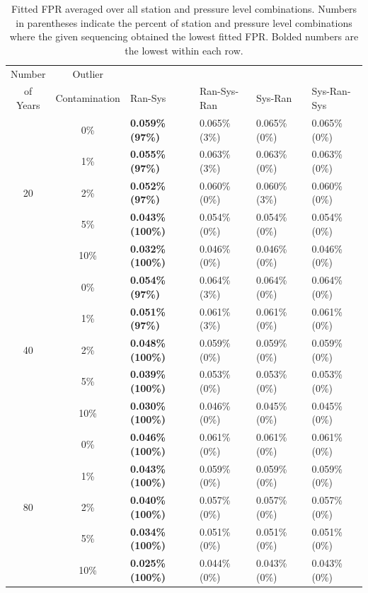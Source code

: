 \documentclass[12pt]{article}
\begin{document}
\begin{landscape}
\begin{table}[ht]
	\centering
	\begin{tabular}{cc|llll}
		\hline
		Number & Outlier & & & &\\ 
		of Years & Contamination & Ran-Sys & Ran-Sys-Ran & Sys-Ran & Sys-Ran-Sys\\ 
		\hline
		 & 0\% & \textbf{0.059\% (97\%)} & 0.065\% (3\%) & 0.065\% (0\%) & 0.065\% (0\%) \\ 
		 & 1\% & \textbf{0.055\% (97\%)} & 0.063\% (3\%) & 0.063\% (0\%) & 0.063\% (0\%) \\ 
		20 & 2\% & \textbf{0.052\% (97\%)} & 0.060\% (0\%) & 0.060\% (3\%) & 0.060\% (0\%) \\ 
		 & 5\% & \textbf{0.043\% (100\%)} & 0.054\% (0\%) & 0.054\% (0\%) & 0.054\% (0\%) \\ 
		 & 10\% & \textbf{0.032\% (100\%)} & 0.046\% (0\%) & 0.046\% (0\%) & 0.046\% (0\%) \\ 
		\hline
		 & 0\% & \textbf{0.054\% (97\%)} & 0.064\% (3\%) & 0.064\% (0\%) & 0.064\% (0\%) \\ 
		 & 1\% & \textbf{0.051\% (97\%)} & 0.061\% (3\%) & 0.061\% (0\%) & 0.061\% (0\%) \\ 
		40 & 2\% & \textbf{0.048\% (100\%)} & 0.059\% (0\%) & 0.059\% (0\%) & 0.059\% (0\%) \\ 
		 & 5\% & \textbf{0.039\% (100\%)} & 0.053\% (0\%) & 0.053\% (0\%) & 0.053\% (0\%) \\ 
		 & 10\% & \textbf{0.030\% (100\%)} & 0.046\% (0\%) & 0.045\% (0\%) & 0.045\% (0\%) \\ 
		\hline
		 & 0\% & \textbf{0.046\% (100\%)} & 0.061\% (0\%) & 0.061\% (0\%) & 0.061\% (0\%) \\ 
		 & 1\% & \textbf{0.043\% (100\%)} & 0.059\% (0\%) & 0.059\% (0\%) & 0.059\% (0\%) \\ 
		80 & 2\% & \textbf{0.040\% (100\%)} & 0.057\% (0\%) & 0.057\% (0\%) & 0.057\% (0\%) \\ 
		 & 5\% & \textbf{0.034\% (100\%)} & 0.051\% (0\%) & 0.051\% (0\%) & 0.051\% (0\%) \\ 
		 & 10\% & \textbf{0.025\% (100\%)} & 0.044\% (0\%) & 0.043\% (0\%) & 0.043\% (0\%) \\ 
		\hline
	\end{tabular}
	\caption{Fitted FPR averaged over all station and pressure level combinations.  Numbers in parentheses indicate the percent of station and pressure level combinations where the given sequencing obtained the lowest fitted FPR. Bolded numbers are the lowest within each row.}
	\label{tab:fitFPR}
\end{table}
\end{landscape}
\end{document}
